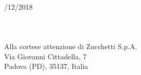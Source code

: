 \documentclass[11pt, a4paper]{letter} %
\begin{document}
\begin{letter}{
	\-\\/12/2018
	\-\\\-\\\-\\\-\\
	Alla cortese attenzione di Zucchetti S.p.A. \\
	Via Giovanni Cittadella, 7\\
	Padova (PD), 35137, Italia
}



\end{letter}
\end{document}

